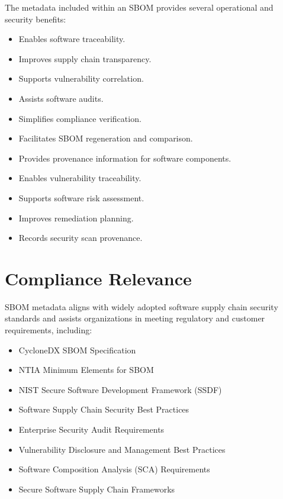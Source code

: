 The metadata included within an SBOM provides several operational and security benefits:
\begin{itemize}
\item Enables software traceability.
\item Improves supply chain transparency.
\item Supports vulnerability correlation.
\item Assists software audits.
\item Simplifies compliance verification.
\item Facilitates SBOM regeneration and comparison.
\item Provides provenance information for software components.
\item Enables vulnerability traceability.
\item Supports software risk assessment.
\item Improves remediation planning.
\item Records security scan provenance.
\end{itemize}

\vspace{0.4cm}


\section{Compliance Relevance}

SBOM metadata aligns with widely adopted software supply chain security standards and assists organizations in meeting regulatory and customer requirements, including:
\begin{itemize}
\item CycloneDX SBOM Specification
\item NTIA Minimum Elements for SBOM
\item NIST Secure Software Development Framework (SSDF)
\item Software Supply Chain Security Best Practices
\item Enterprise Security Audit Requirements
\item Vulnerability Disclosure and Management Best Practices
\item Software Composition Analysis (SCA) Requirements
\item Secure Software Supply Chain Frameworks
\end{itemize}

